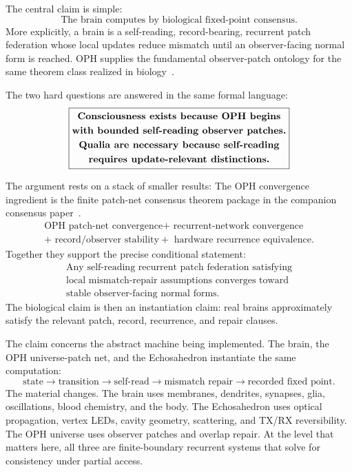 \documentclass[11pt]{article}
\theoremstyle{remark}
\theoremstyle{plain}
\begin{document}
The central claim is simple:
\[
\boxed{
\text{The brain computes by biological fixed-point consensus.}
}
\]
More explicitly, a brain is a self-reading, record-bearing, recurrent patch federation whose local updates reduce mismatch until an observer-facing normal form is reached. OPH supplies the fundamental observer-patch ontology for the same theorem class realized in biology~\cite{ObserversAreAllYouNeed,RealityAsConsensusProtocol}.

The two hard questions are answered in the same formal language:
\[
\boxed{
\begin{gathered}
\text{\bfseries Consciousness exists because OPH begins}\\
\text{\bfseries with bounded self-reading observer patches.}\\
\text{\bfseries Qualia are necessary because self-reading}\\
\text{\bfseries requires update-relevant distinctions.}
\end{gathered}
}
\]

The argument rests on a stack of smaller results:
The OPH convergence ingredient is the finite patch-net consensus theorem package in the companion consensus paper~\cite{RealityAsConsensusProtocol}.
\[
\boxed{
\begin{gathered}
\text{OPH patch-net convergence}
+\text{ recurrent-network convergence}\\
+\text{ record/observer stability}
+\text{ hardware recurrence equivalence}.
\end{gathered}
}
\]
Together they support the precise conditional statement:
\[
\boxed{
\begin{gathered}
\text{Any self-reading recurrent patch federation satisfying}\\
\text{local mismatch-repair assumptions converges toward}\\
\text{stable observer-facing normal forms.}
\end{gathered}
}
\]
The biological claim is then an instantiation claim: real brains approximately satisfy the relevant patch, record, recurrence, and repair clauses.

The claim concerns the abstract machine being implemented. The brain, the OPH universe-patch net, and the Echosahedron instantiate the same computation:
\[
\boxed{
\text{state}
\longrightarrow
\text{transition}
\longrightarrow
\text{self-read}
\longrightarrow
\text{mismatch repair}
\longrightarrow
\text{recorded fixed point}.
}
\]
The material changes. The brain uses membranes, dendrites, synapses, glia, oscillations, blood chemistry, and the body. The Echosahedron uses optical propagation, vertex LEDs, cavity geometry, scattering, and TX/RX reversibility. The OPH universe uses observer patches and overlap repair. At the level that matters here, all three are finite-boundary recurrent systems that solve for consistency under partial access.
\end{document}
